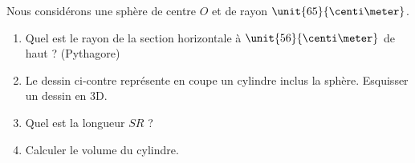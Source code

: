 
\begin{exercice}\label{exosmath-0094}

\begin{wrapfigure}{r}{0.2\textwidth}
    \centering

\end{wrapfigure}

    Nous considérons une sphère de centre \( O\) et de rayon \( \unit{65}{\centi\meter}\).
        \begin{enumerate}
            \item
                Quel est le rayon de la section horizontale à \( \unit{56}{\centi\meter}\) de haut ? (Pythagore)
            \item
                Le dessin ci-contre représente en coupe un cylindre inclus la sphère. Esquisser un dessin en 3D.
            \item
                Quel est la longueur \( SR\) ?
            \item
                Calculer le volume du cylindre.
        \end{enumerate}

%

\end{exercice}
